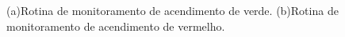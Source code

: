 \begin{figure}[ht]
    \begin{center}
    \end{center}
    \caption[Fluxos botoeira]{(a)Rotina de monitoramento de acendimento de verde. (b)Rotina de monitoramento de acendimento de vermelho.}
    \label{fluxos}
\end{figure}
